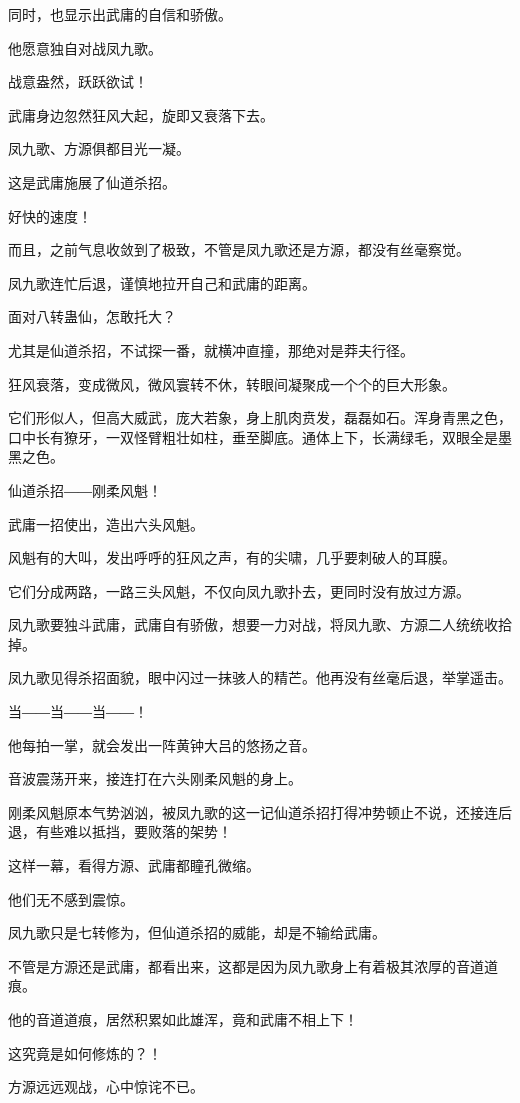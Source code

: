 \begin{this_body}
同时，也显示出武庸的自信和骄傲。

他愿意独自对战凤九歌。

战意盎然，跃跃欲试！

武庸身边忽然狂风大起，旋即又衰落下去。

凤九歌、方源俱都目光一凝。

这是武庸施展了仙道杀招。

好快的速度！

而且，之前气息收敛到了极致，不管是凤九歌还是方源，都没有丝毫察觉。

凤九歌连忙后退，谨慎地拉开自己和武庸的距离。

面对八转蛊仙，怎敢托大？

尤其是仙道杀招，不试探一番，就横冲直撞，那绝对是莽夫行径。

狂风衰落，变成微风，微风寰转不休，转眼间凝聚成一个个的巨大形象。

它们形似人，但高大威武，庞大若象，身上肌肉贲发，磊磊如石。浑身青黑之色，口中长有獠牙，一双怪臂粗壮如柱，垂至脚底。通体上下，长满绿毛，双眼全是墨黑之色。

仙道杀招――刚柔风魁！

武庸一招使出，造出六头风魁。

风魁有的大叫，发出呼呼的狂风之声，有的尖啸，几乎要刺破人的耳膜。

它们分成两路，一路三头风魁，不仅向凤九歌扑去，更同时没有放过方源。

凤九歌要独斗武庸，武庸自有骄傲，想要一力对战，将凤九歌、方源二人统统收拾掉。

凤九歌见得杀招面貌，眼中闪过一抹骇人的精芒。他再没有丝毫后退，举掌遥击。

当――当――当――！

他每拍一掌，就会发出一阵黄钟大吕的悠扬之音。

音波震荡开来，接连打在六头刚柔风魁的身上。

刚柔风魁原本气势汹汹，被凤九歌的这一记仙道杀招打得冲势顿止不说，还接连后退，有些难以抵挡，要败落的架势！

这样一幕，看得方源、武庸都瞳孔微缩。

他们无不感到震惊。

凤九歌只是七转修为，但仙道杀招的威能，却是不输给武庸。

不管是方源还是武庸，都看出来，这都是因为凤九歌身上有着极其浓厚的音道道痕。

他的音道道痕，居然积累如此雄浑，竟和武庸不相上下！

这究竟是如何修炼的？！

方源远远观战，心中惊诧不已。


\end{this_body}
